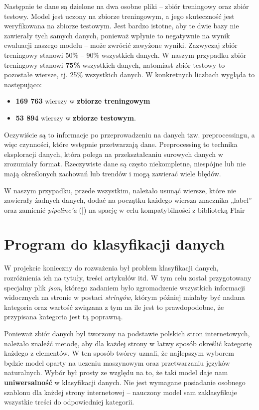 Następnie te dane są dzielone na dwa osobne pliki – zbiór treningowy oraz zbiór testowy. Model jest uczony na zbiorze treningowym, a jego skuteczność jest weryfikowana na zbiorze testowym. Jest bardzo istotne, aby te dwie bazy nie zawierały tych samych danych, ponieważ wpłynie to negatywnie na wynik ewaluacji naszego modelu – może zwrócić zawyżone wyniki. Zazwyczaj zbiór treningowy stanowi 50\% – 90\% wszystkich danych. W naszym przypadku zbiór treningowy stanowi \textbf{75\%} wszystkich danych, natomiast zbiór testowy to pozostałe wiersze, tj. 25\% wszystkich danych. W konkretnych liczbach wygląda to następująco:
\begin{itemize}[label=\textbullet]
\item \textbf{169 763} wierszy w \textbf{zbiorze treningowym}
\item \textbf{53 894} wierszy w \textbf{zbiorze testowym}.
\end{itemize}
Oczywiście są to informacje po przeprowadzeniu na danych tzw. preprocessingu, a więc czynności, które wstępnie przetwarzają dane. 
Preprocessing to technika eksploracji danych, która polega na przekształcaniu surowych danych w zrozumiały format. Rzeczywiste dane są często niekompletne, niespójne lub nie mają określonych zachowań lub trendów i mogą zawierać wiele błędów.

W naszym przypadku, przede wszystkim, należało usunąć wiersze, które nie zawierały żadnych danych, dodać na początku każdego wiersza znacznika „label” oraz zamienić \emph{pipeline’a} (|) na spację w celu kompatybilności z biblioteką Flair


\section{Program do klasyfikacji danych}
\label{sec:3.2}

W projekcie konieczny do rozważenia był problem klasyfikacji danych, rozróżnienia ich na tytuły, treści artykułów itd. W tym celu został przygotowany specjalny plik \emph{json}, którego zadaniem było zgromadzenie wszystkich informacji widocznych na stronie w postaci \emph{stringów}, którym później miałaby być nadana kategoria oraz wartość związana z tym na ile jest to prawdopodobne, że przypisana kategoria jest tą poprawną.

Ponieważ zbiór danych był tworzony na podstawie polskich stron internetowych, należało znaleźć metodę, aby dla każdej strony w łatwy sposób określić kategorię każdego z elementów. W ten sposób twórcy uznali, że najlepszym wyborem będzie model oparty na uczeniu maszynowym oraz przetwarzaniu języków naturalnych. Wybór był prosty ze względu na to, że taki model daje nam \textbf{uniwersalność} w klasyfikacji danych. Nie jest wymagane posiadanie osobnego szablonu dla każdej strony internetowej – nauczony model sam zaklasyfikuje wszystkie treści do odpowiedniej kategorii.

